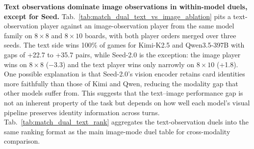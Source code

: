 
\noindent\textbf{Text observations dominate image observations in within-model duels, except for Seed.}
Tab.~\ref{tab:match_dual_text_vs_image_ablation} pits a text-observation player against an image-observation player from the same model family on $8{\times}8$ and $8{\times}10$ boards, with both player orders merged over three seeds. The text side wins 100\% of games for Kimi-K2.5 and Qwen3.5-397B with gaps of +22.7 to +35.7 pairs, while Seed-2.0 is the exception: the image player wins on $8{\times}8$ ($-$3.3) and the text player wins only narrowly on $8{\times}10$ (+1.8). One possible explanation is that Seed-2.0's vision encoder retains card identities more faithfully than those of Kimi and Qwen, reducing the modality gap that other models suffer from. This suggests that the text--image performance gap is not an inherent property of the task but depends on how well each model's visual pipeline preserves identity information across turns. Tab.~\ref{tab:match_dual_text_rank} aggregates the text-observation duels into the same ranking format as the main image-mode duel table for cross-modality comparison.







